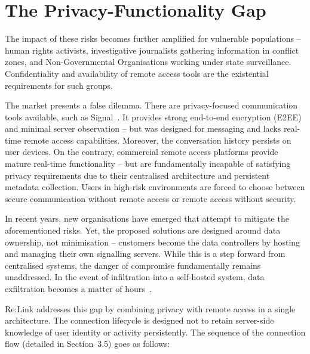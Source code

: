 \documentclass[12pt,a4paper,oneside]{report}
\begin{document}
\section{The Privacy-Functionality Gap}
\label{sec:privacy-gap}

The impact of these risks becomes further amplified for vulnerable populations -- human rights activists, investigative journalists gathering information in conflict zones, and Non-Governmental Organisations working under state surveillance. Confidentiality and availability of remote access tools are the existential requirements for such groups.

The market presents a false dilemma. There are privacy-focused communication tools available, such as Signal~\cite{signal}. It provides strong end-to-end encryption (E2EE) and minimal server observation -- but was designed for messaging and lacks real-time remote access capabilities. Moreover, the conversation history persists on user devices. On the contrary, commercial remote access platforms provide mature real-time functionality -- but are fundamentally incapable of satisfying privacy requirements due to their centralised architecture and persistent metadata collection. Users in high-risk environments are forced to choose between secure communication without remote access or remote access without security.

In recent years, new organisations have emerged that attempt to mitigate the aforementioned risks. Yet, the proposed solutions are designed around data ownership, not minimisation -- customers become the data controllers by hosting and managing their own signalling servers. While this is a step forward from centralised systems, the danger of compromise fundamentally remains unaddressed. In the event of infiltration into a self-hosted system, data exfiltration becomes a matter of hours~\cite{selfhostexfil}.

Re:Link addresses this gap by combining privacy with remote access in a single architecture. The connection lifecycle is designed not to retain server-side knowledge of user identity or activity persistently. The sequence of the connection flow (detailed in Section~3.5) goes as follows:
\end{document}
